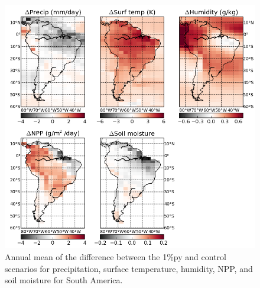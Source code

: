 \documentclass{article}
\begin{document}
\begin{figure}[hbp]
    \centering
    \includegraphics[width=\textwidth]{figures/sa_diff}
    \caption{Annual mean of the difference between the 1\%py and control scenarios for precipitation, surface temperature, humidity, NPP, and soil moisture for South America.}
    \label{fig:sa_diff}
\end{figure}

\newpage

\end{document}

